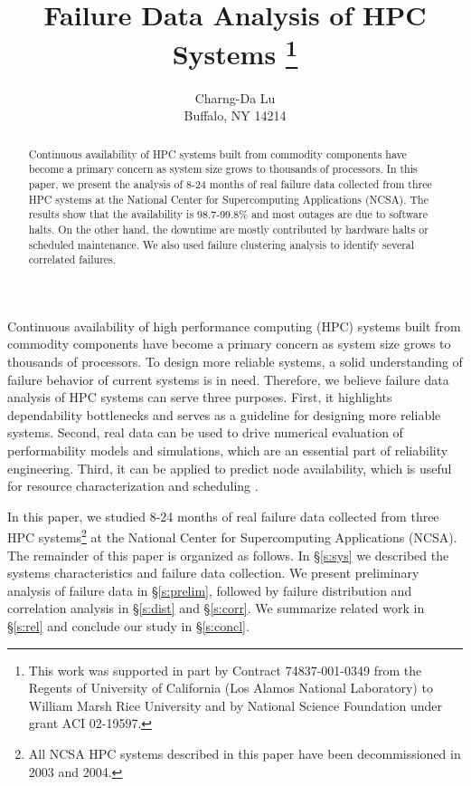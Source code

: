 \documentclass[10pt,twocolumn]{article}
\begin{document}
\title{
{\bf Failure Data Analysis of HPC Systems}
   \thanks{
    This work was supported in part by
    Contract 74837-001-0349 from the Regents of University of
    California (Los Alamos National Laboratory) to William Marsh
    Rice University and by National Science
    Foundation under grant ACI 02-19597.
   }
}

\author{
Charng-Da Lu\\
Buffalo, NY 14214
}

\maketitle
\thispagestyle{empty}

\begin{abstract}

Continuous availability of HPC
systems built from commodity components have become a
primary concern as system size grows to thousands of 
processors. In this paper, we present the analysis of
8-24 months of real failure data collected from three 
HPC systems at the National Center for Supercomputing 
Applications (NCSA). The results show that the availability 
is 98.7-99.8\% and most outages are due to software halts. 
On the other hand, the downtime are mostly contributed by 
hardware halts or scheduled maintenance. We also used
failure clustering analysis to identify several correlated 
failures. 

\end{abstract}

Continuous availability of high performance computing (HPC) 
systems built from commodity components have become a primary 
concern as system size grows 
to thousands of processors. To design more reliable systems, 
a solid understanding of failure behavior of current systems
is in need. Therefore, we believe failure data analysis of 
HPC systems can serve three purposes. First, it highlights
dependability bottlenecks and serves as a guideline for
designing more reliable systems. Second, real data can 
be used to drive numerical evaluation of performability
models and simulations, which are an essential part of
reliability engineering. Third, it can be applied to predict
node availability, which is useful for resource characterization
and scheduling \cite{Brevik:03}.

In this paper, we studied 8-24 months of real failure data
collected from three HPC systems\footnote{All NCSA HPC 
systems described in this paper have been decommissioned 
in 2003 and 2004.} at the National Center for 
Supercomputing Applications (NCSA). 
The remainder of this paper is organized as follows. In
\S\ref{s:sys} we described the systems characteristics
and failure data collection. We present preliminary analysis of
failure data in \S\ref{s:prelim}, followed by failure 
distribution and correlation analysis in \S\ref{s:dist} 
and \S\ref{s:corr}. We summarize related work in
\S\ref{s:rel} and conclude our study in 
\S\ref{s:concl}.
\end{document}
